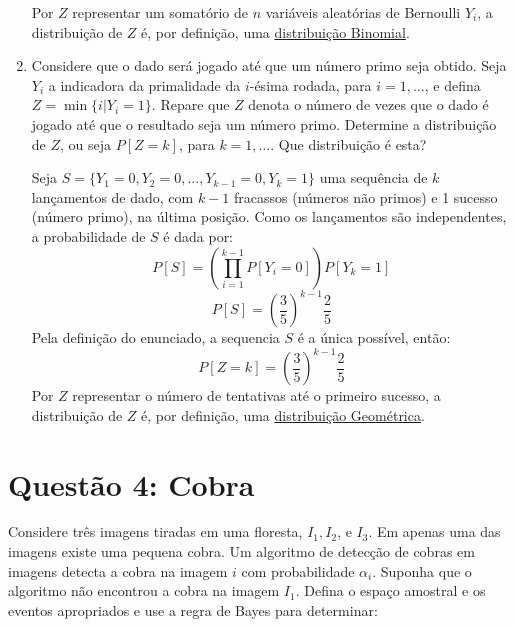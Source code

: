 \documentclass[12 pt]{article}
\begin{document}
\begin{enumerate}
\begin{tcolorbox}[colframe=black, title=Resposta:]
        Por $Z$ representar um somatório de $n$ variáveis aleatórias de Bernoulli $Y_i$, a distribuição de $Z$ é, por definição, uma \underline{distribuição Binomial}.
    \end{tcolorbox}
    \newpage
    \item Considere que o dado será jogado até que um número primo seja obtido. Seja $Y_i$ a indicadora da primalidade da $i$-ésima rodada, para $i = 1, \dots$, e defina $Z = \min\{i | Y_i = 1\}$. Repare que $Z$ denota o número de vezes que o dado é jogado até que o resultado seja um número primo. Determine a distribuição de $Z$, ou seja $P [Z = k]$, para $k = 1, \dots$. Que distribuição é esta?
    \begin{tcolorbox}[colframe=black, title=Resposta:]
        Seja $S=\{Y_1=0, Y_2=0, ..., Y_{k-1}=0, Y_k=1\}$ uma sequência de $k$ lançamentos de dado, com $k-1$ fracassos (números não primos) e 1 sucesso (número primo), na última posição. Como os lançamentos são independentes, a probabilidade de $S$ é dada por:
        $$P[S] = \left(\prod_{i=1}^{k-1} P[Y_i = 0] \right)  P[Y_k=1]$$
        $$P[S] = \left(\frac{3}{5}\right)^{k-1} \frac{2}{5}$$
        Pela definição do enunciado, a sequencia $S$ é a única possível, então:
        $$\boxed{P[Z = k] = \left(\frac{3}{5}\right)^{k-1} \frac{2}{5}}$$
        Por $Z$ representar o número de tentativas até o primeiro sucesso, a distribuição de $Z$ é, por definição, uma \underline{distribuição Geométrica}.
    \end{tcolorbox}
\end{enumerate}

\section*{Questão 4: Cobra}
Considere três imagens tiradas em uma floresta, $I_1, I_2$, e $I_3$. Em apenas uma das imagens existe uma
pequena cobra. Um algoritmo de detecção de cobras em imagens detecta a cobra na imagem $i$ com
probabilidade $\alpha_i$. Suponha que o algoritmo não encontrou a cobra na imagem $I_1$. Defina o espaço
amostral e os eventos apropriados e use a regra de Bayes para determinar:
\end{document}
